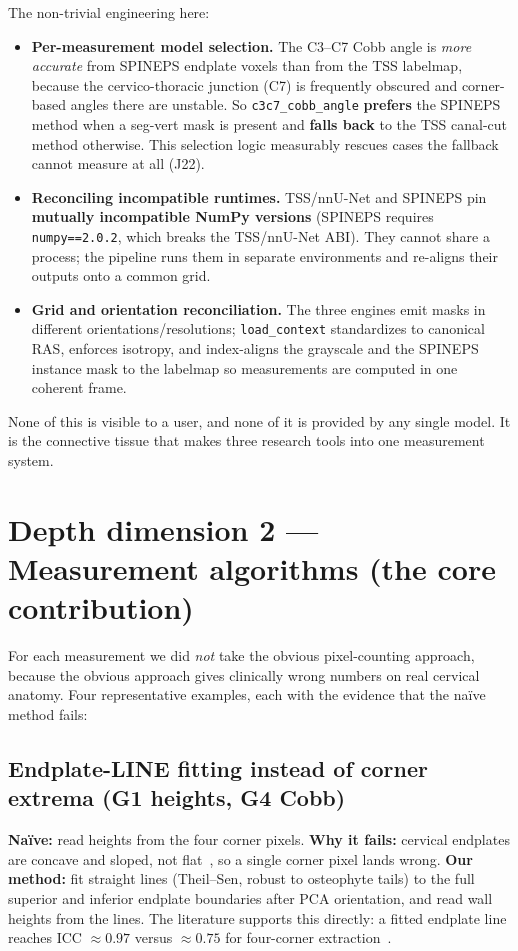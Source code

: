 \documentclass[11pt]{article}
\begin{document}
\noindent The non-trivial engineering here:
\begin{itemize}
  \item \textbf{Per-measurement model selection.} The C3--C7 Cobb angle is \emph{more accurate} from
  SPINEPS endplate voxels than from the TSS labelmap, because the cervico-thoracic junction (C7) is
  frequently obscured and corner-based angles there are unstable. So \texttt{c3c7\_cobb\_angle}
  \textbf{prefers} the SPINEPS method when a seg-vert mask is present and \textbf{falls back} to the TSS
  canal-cut method otherwise. This selection logic measurably rescues cases the fallback cannot measure
  at all (J22).
  \item \textbf{Reconciling incompatible runtimes.} TSS/nnU-Net and SPINEPS pin \textbf{mutually
  incompatible NumPy versions} (SPINEPS requires \texttt{numpy==2.0.2}, which breaks the TSS/nnU-Net
  ABI). They cannot share a process; the pipeline runs them in separate environments and re-aligns their
  outputs onto a common grid.
  \item \textbf{Grid and orientation reconciliation.} The three engines emit masks in different
  orientations/resolutions; \texttt{load\_context} standardizes to canonical RAS, enforces isotropy, and
  index-aligns the grayscale and the SPINEPS instance mask to the labelmap so measurements are computed
  in one coherent frame.
\end{itemize}

None of this is visible to a user, and none of it is provided by any single model. It is the connective
tissue that makes three research tools into one measurement system.

\section{Depth dimension 2 --- Measurement algorithms (the core contribution)}
For each measurement we did \emph{not} take the obvious pixel-counting approach, because the obvious
approach gives clinically wrong numbers on real cervical anatomy. Four representative examples, each with
the evidence that the na\"ive method fails:

\subsection{Endplate-LINE fitting instead of corner extrema (G1 heights, G4 Cobb)}
\textbf{Na\"ive:} read heights from the four corner pixels. \textbf{Why it fails:} cervical endplates
are concave and sloped, not flat~\cite{chen2013}, so a single corner pixel lands wrong.
\textbf{Our method:} fit straight lines (Theil--Sen, robust to osteophyte tails) to the full superior
and inferior endplate boundaries after PCA orientation, and read wall heights from the lines. The
literature supports this directly: a fitted endplate line reaches ICC $\approx 0.97$ versus $\approx
0.75$ for four-corner extraction~\cite{wang2023}.
\end{document}
